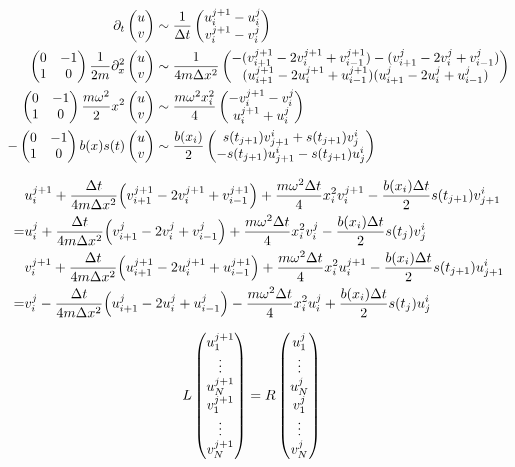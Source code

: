 \documentclass[a4paper,10pt]{article}
\begin{document}
\begin{align}
	\partial_t
	\pmqty{u\\v}
	&\sim
	\frac{1}{\Delta t}
	\pmqty{u_i^{j+1}-u_i^{j}\\v_i^{j+1}-v_i^{j}}
\\
	\pmqty{0&-1\\1&0}	
	\frac{1}{2m}
	\partial_x^2
	\pmqty{u\\v}
	&\sim
	\frac{1}{4m\Delta x^2}
	\pmqty{
		-(v^{j+1}_{i+1}-2v^{j+1}_{i}+v^{j+1}_{i-1})
		-(v^{j}_{i+1}-2v^{j}_{i}+v^{j}_{i-1})
		\\
		(u^{j+1}_{i+1}-2u^{j+1}_{i}+u^{j+1}_{i-1})
		(u^{j}_{i+1}-2u^{j}_{i}+u^{j}_{i-1})
	}
\\
	\pmqty{0&-1\\1&0}
	\frac{m\omega^2}{2}
	x^2
	\pmqty{u\\v}
	&\sim
	\frac{m\omega^2 x^2_{i}}{4}
	\pmqty{
		-v^{j+1}_i-v^{j}_i
		\\
		u^{j+1}_i+u^{j}_i		
	}
\\
	-
	\pmqty{0&-1\\1&0}
	b(x)
	s(t)
	\pmqty{u\\v}
	&\sim
	\frac{b(x_{i})}{2}
	\pmqty{
		s(t_{j+1})v_{j+1}^i+s(t_{j+1})v_{j}^i
		\\
		-s(t_{j+1})u_{j+1}^i-s(t_{j+1})u_{j}^i
	}
\end{align}







\begin{align}
	&
	u^{j+1}_i
	+
	\frac{\Delta t}{4m\Delta x^2}
	\pqty{
		v^{j+1}_{i+1}-2v^{j+1}_{i}+v^{j+1}_{i-1}
	}
	+
	\frac{m\omega^2\Delta t}{4}
	x^2_{i}v^{j+1}_i
	-
	\frac{b(x_{i})\Delta t}{2}
	s(t_{j+1})v_{j+1}^i
\\
	=&
	u^{j}_i
	+
	\frac{\Delta t}{4m\Delta x^2}
	\pqty{
		v^{j}_{i+1}-2v^{j}_{i}+v^{j}_{i-1}
	}
	+
	\frac{m\omega^2\Delta t}{4}
	x^2_{i}v^{j}_i
	-
	\frac{b(x_{i})\Delta t}{2}
	s(t_{j})v_{j}^i
\\
	&
	v^{j+1}_i
	+
	\frac{\Delta t}{4m\Delta x^2}
	\pqty{
		u^{j+1}_{i+1}-2u^{j+1}_{i}+u^{j+1}_{i-1}
	}
	+
	\frac{m\omega^2\Delta t}{4}
	x^2_{i}u^{j+1}_i
	-
	\frac{b(x_{i})\Delta t}{2}
	s(t_{j+1})u_{j+1}^i
\\
	=&
	v^{j}_i
	-
	\frac{\Delta t}{4m\Delta x^2}
	\pqty{
		u^{j}_{i+1}-2u^{j}_{i}+u^{j}_{i-1}
	}
	-
	\frac{m\omega^2\Delta t}{4}
	x^2_{i}u^{j}_i
	+
	\frac{b(x_{i})\Delta t}{2}
	s(t_{j})u_{j}^i
\end{align}




\begin{align}
	L
	\pmqty{
		u^{j+1}_1
		\\
		\vdots
		\\
		u^{j+1}_N
		\\		
		v^{j+1}_1
		\\
		\vdots
		\\
		v^{j+1}_N
	}
	&=
	R
	\pmqty{
		u^{j}_1
		\\
		\vdots
		\\
		u^{j}_N
		\\		
		v^{j}_1
		\\
		\vdots
		\\
		v^{j}_N
	}
\end{align}
\end{document}
